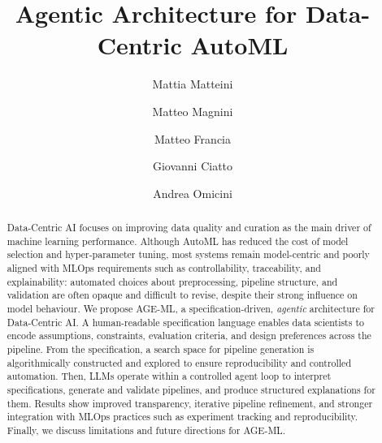 \documentclass[runningheads]{llncs}
\newcommand{\ourapproach}[0]{\textsc{AGE-ML}}
\begin{document}
\sloppy
%
\title{Agentic Architecture for Data-Centric \acs{AutoML}}
%
%
\author{
Mattia Matteini \and
Matteo Magnini \and
Matteo Francia \and
Giovanni Ciatto \and
Andrea Omicini
}
%
%
%
\maketitle              %
%
\begin{abstract}
Data-Centric \ac{AI} focuses on improving data quality and curation as the main driver of machine learning performance.
%
Although \ac{AutoML} has reduced the cost of model selection and hyper-parameter tuning,
most systems remain model-centric and poorly aligned with \ac{MLOps} requirements such as controllability, traceability, and explainability: automated choices about preprocessing, pipeline structure, and validation are often opaque and difficult to revise, despite their strong influence on model behaviour.
%
We propose \ourapproach{}, a specification-driven, \textit{agentic} architecture for Data-Centric AI.
%
A human-readable specification language enables data scientists to encode assumptions, constraints, evaluation criteria, and design preferences across the pipeline.
%
From the specification, a search space for pipeline generation is algorithmically constructed and explored to ensure reproducibility and controlled automation.
%
Then, \acp{LLM} operate within a controlled agent loop to interpret specifications, generate and validate pipelines, and produce structured explanations for them.
%
Results show improved transparency, iterative pipeline refinement, and stronger integration with \ac{MLOps} practices such as experiment tracking and reproducibility.
%
Finally, we discuss limitations and future directions for \ourapproach{}.

\end{abstract}
%
%
%
\end{document}
